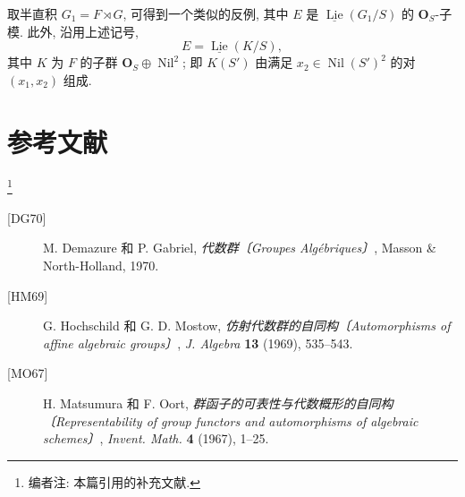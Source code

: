 取半直积 \(G_1=F\rtimes G\), 可得到一个类似的反例,
其中 \(E\) 是 \(\underline{\operatorname{Lie}}(G_1/S)\) 的
\(\mathbf O_S\)-子模. 此外, 沿用上述记号,
\[
 E=\underline{\operatorname{Lie}}(K/S),
\]
其中 \(K\) 为 \(F\) 的子群 \(\mathbf O_S\oplus\operatorname{Nil}^2\);
即 \(K(S')\) 由满足 \(x_2\in\operatorname{Nil}(S')^2\) 的对
\((x_1,x_2)\) 组成.

\section*{参考文献}
\footnote{编者注: 本篇引用的补充文献.}

\begin{description}
\item[{[DG70]}] M. Demazure 和 P. Gabriel,
  \emph{代数群〔Groupes Alg\'ebriques〕}, Masson \& North-Holland, 1970.
\item[{[HM69]}] G. Hochschild 和 G. D. Mostow,
  \emph{仿射代数群的自同构〔Automorphisms of affine algebraic groups〕},
  \emph{J. Algebra} \textbf{13} (1969), 535--543.
\item[{[MO67]}] H. Matsumura 和 F. Oort,
  \emph{群函子的可表性与代数概形的自同构〔Representability of group functors and automorphisms of
  algebraic schemes〕}, \emph{Invent. Math.} \textbf{4} (1967), 1--25.
\end{description}





